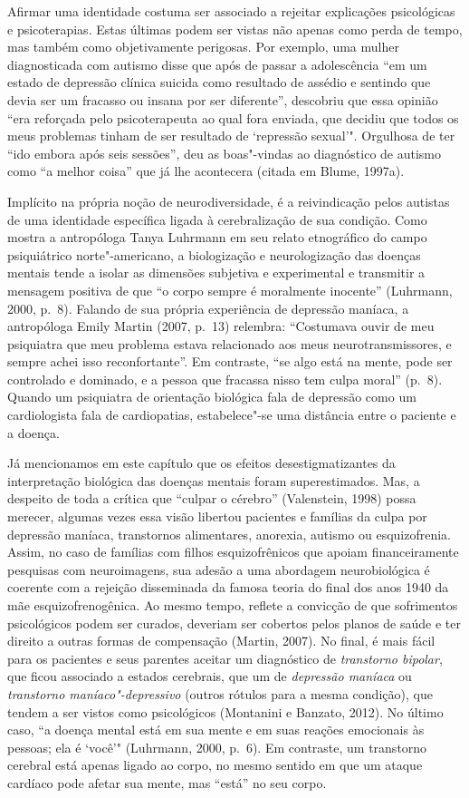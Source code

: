 Afirmar uma identidade costuma ser associado a rejeitar explicações
psicológicas e psicoterapias. Estas últimas podem ser vistas não apenas
como perda de tempo, mas também como objetivamente perigosas. Por
exemplo, uma mulher diagnosticada com autismo disse que após de passar a
adolescência ``em um estado de depressão clínica suicida como resultado
de assédio e sentindo que devia ser um fracasso ou insana por ser
diferente'', descobriu que essa opinião ``era reforçada pelo
psicoterapeuta ao qual fora enviada, que decidiu que todos os meus
problemas tinham de ser resultado de `repressão sexual'". Orgulhosa de
ter ``ido embora após seis sessões'', deu as boas"-vindas ao diagnóstico
de autismo como ``a melhor coisa'' que já lhe acontecera (citada em
Blume, 1997a).

Implícito na própria noção de neurodiversidade, é a reivindicação pelos
autistas de uma identidade específica ligada à cerebralização de sua
condição. Como mostra a antropóloga Tanya Luhrmann em seu relato
etnográfico do campo psiquiátrico norte"-americano, a biologização e
neurologização das doenças mentais tende a isolar as dimensões subjetiva
e experimental e transmitir a mensagem positiva de que ``o corpo sempre
é moralmente inocente'' (Luhrmann, 2000, p.~8). Falando de sua própria
experiência de depressão maníaca, a antropóloga Emily Martin (2007,
p.~13) relembra: ``Costumava ouvir de meu psiquiatra que meu problema
estava relacionado aos meus neurotransmissores, e sempre achei isso
reconfortante''. Em contraste, ``se algo está na mente, pode ser
controlado e dominado, e a pessoa que fracassa nisso tem culpa moral''
(p.~8). Quando um psiquiatra de orientação biológica fala de depressão
como um cardiologista fala de cardiopatias, estabelece"-se uma distância
entre o paciente e a doença.

Já mencionamos em este capítulo que os efeitos desestigmatizantes da
interpretação biológica das doenças mentais foram superestimados. Mas, a
despeito de toda a crítica que ``culpar o cérebro'' (Valenstein, 1998)
possa merecer, algumas vezes essa visão libertou pacientes e famílias da
culpa por depressão maníaca, transtornos alimentares, anorexia, autismo
ou esquizofrenia. Assim, no caso de famílias com filhos esquizofrênicos
que apoiam financeiramente pesquisas com neuroimagens, sua adesão a uma
abordagem neurobiológica é coerente com a rejeição disseminada da famosa
teoria do final dos anos 1940 da mãe esquizofrenogênica. Ao mesmo tempo,
reflete a convicção de que sofrimentos psicológicos podem ser curados,
deveriam ser cobertos pelos planos de saúde e ter direito a outras
formas de compensação (Martin, 2007). No final, é mais fácil para os
pacientes e seus parentes aceitar um diagnóstico de \emph{transtorno
bipolar}, que ficou associado a estados cerebrais, que um de
\emph{depressão maníaca} ou \emph{transtorno maníaco"-depressivo} (outros
rótulos para a mesma condição), que tendem a ser vistos como
psicológicos (Montanini e Banzato, 2012). No último caso, ``a doença
mental está em sua mente e em suas reações emocionais às pessoas; ela é
`você'" (Luhrmann, 2000, p.~6). Em contraste, um transtorno cerebral
está apenas ligado ao corpo, no mesmo sentido em que um ataque cardíaco
pode afetar sua mente, mas ``está'' no seu corpo.

